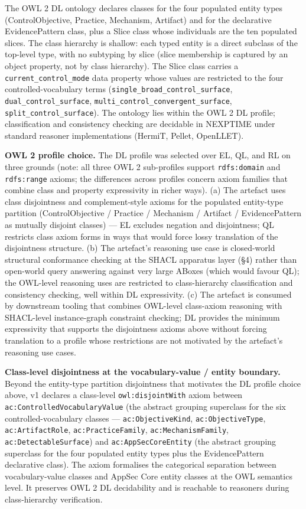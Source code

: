 \documentclass[
]{article}
\begin{document}
The OWL 2 DL ontology declares classes for the four populated entity
types (ControlObjective, Practice, Mechanism, Artifact) and for the
declarative EvidencePattern class, plus a Slice class whose individuals
are the ten populated slices. The class hierarchy is shallow: each typed
entity is a direct subclass of the top-level type, with no subtyping by
slice (slice membership is captured by an object property, not by class
hierarchy). The Slice class carries a \texttt{current\_control\_mode}
data property whose values are restricted to the four
controlled-vocabulary terms (\texttt{single\_broad\_control\_surface},
\texttt{dual\_control\_surface},
\texttt{multi\_control\_convergent\_surface},
\texttt{split\_control\_surface}). The ontology lies within the OWL 2 DL
profile; classification and consistency checking are decidable in
NEXPTIME under standard reasoner implementations (HermiT, Pellet,
OpenLLET).

\textbf{OWL 2 profile choice.} The DL profile was selected over EL, QL,
and RL on three grounds (note: all three OWL 2 sub-profiles support
\texttt{rdfs:domain} and \texttt{rdfs:range} axioms; the differences
across profiles concern axiom families that combine class and property
expressivity in richer ways). (a) The artefact uses class disjointness
and complement-style axioms for the populated entity-type partition
(ControlObjective / Practice / Mechanism / Artifact / EvidencePattern as
mutually disjoint classes) --- EL excludes negation and disjointness; QL
restricts class axiom forms in ways that would force lossy translation
of the disjointness structure. (b) The artefact's reasoning use case is
closed-world structural conformance checking at the SHACL apparatus
layer (§4) rather than open-world query answering against very large
ABoxes (which would favour QL); the OWL-level reasoning uses are
restricted to class-hierarchy classification and consistency checking,
well within DL expressivity. (c) The artefact is consumed by downstream
tooling that combines OWL-level class-axiom reasoning with SHACL-level
instance-graph constraint checking; DL provides the minimum expressivity
that supports the disjointness axioms above without forcing translation
to a profile whose restrictions are not motivated by the artefact's
reasoning use cases.

\textbf{Class-level disjointness at the vocabulary-value / entity
boundary.} Beyond the entity-type partition disjointness that motivates
the DL profile choice above, v1 declares a class-level
\texttt{owl:disjointWith} axiom between
\texttt{ac:ControlledVocabularyValue} (the abstract grouping superclass
for the six controlled-vocabulary classes --- \texttt{ac:ObjectiveKind},
\texttt{ac:ObjectiveType}, \texttt{ac:ArtifactRole},
\texttt{ac:PracticeFamily}, \texttt{ac:MechanismFamily},
\texttt{ac:DetectableSurface}) and \texttt{ac:AppSecCoreEntity} (the
abstract grouping superclass for the four populated entity types plus
the EvidencePattern declarative class). The axiom formalises the
categorical separation between vocabulary-value classes and AppSec Core
entity classes at the OWL semantics level. It preserves OWL 2 DL
decidability and is reachable to reasoners during class-hierarchy
verification.
\end{document}

